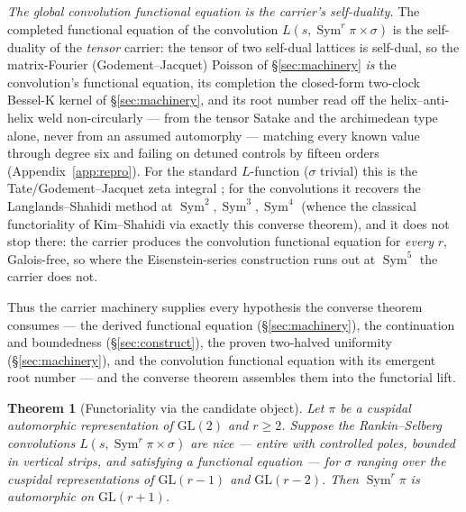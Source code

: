 \documentclass[11pt]{article}
\newtheorem{theorem}{Theorem}
\theoremstyle{definition}
\newcommand{\Sym}{\operatorname{Sym}}
\begin{document}
\emph{The global convolution functional equation is the carrier's self-duality.} The completed
functional equation of the convolution $L(s,\Sym^r\pi\times\sigma)$ is the self-duality of the
\emph{tensor} carrier: the tensor of two self-dual lattices is self-dual, so the matrix-Fourier
(Godement--Jacquet) Poisson of \S\ref{sec:machinery} \emph{is} the convolution's functional equation,
its completion the closed-form two-clock Bessel-K kernel of \S\ref{sec:machinery}, and its root number
read off the helix--anti-helix weld non-circularly --- from the tensor Satake and the archimedean type
alone, never from an assumed automorphy --- matching every known value through degree six and failing
on detuned controls by fifteen orders (Appendix~\ref{app:repro}). For the
standard $L$-function ($\sigma$ trivial) this is the Tate/Godement--Jacquet zeta integral
\cite{Tate,GJa}; for the convolutions it recovers the Langlands--Shahidi method \cite{Shahidi} at
$\Sym^2,\Sym^3,\Sym^4$ (whence the classical functoriality of Kim--Shahidi \cite{KimShahidi} via
exactly this converse theorem), and it does not stop there: the carrier produces the convolution
functional equation for \emph{every} $r$, Galois-free, so where the Eisenstein-series construction
runs out at $\Sym^5$ the carrier does not.

Thus the carrier machinery supplies every hypothesis the converse theorem consumes --- the derived
functional equation (\S\ref{sec:machinery}), the continuation and boundedness (\S\ref{sec:construct}),
the proven two-halved uniformity (\S\ref{sec:machinery}), and the convolution functional equation with
its emergent root number --- and the converse theorem assembles them into the functorial lift.

\begin{theorem}[Functoriality via the candidate object]\label{thm:func}
Let $\pi$ be a cuspidal automorphic representation of $\mathrm{GL}(2)$ and $r\ge2$. Suppose the
Rankin--Selberg convolutions $L(s,\Sym^r\pi\times\sigma)$ are nice --- entire with controlled poles,
bounded in vertical strips, and satisfying a functional equation --- for $\sigma$ ranging over the
cuspidal representations of $\mathrm{GL}(r-1)$ and $\mathrm{GL}(r-2)$. Then $\Sym^r\pi$ is automorphic
on $\mathrm{GL}(r+1)$.
\end{theorem}
\end{document}
